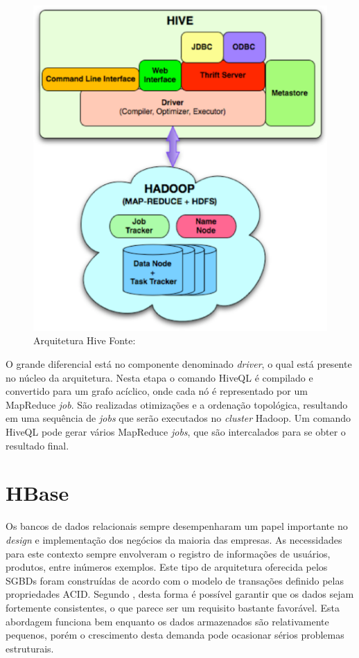 \begin{figure}[ht!]
	\centering
	\includegraphics[keepaspectratio=true,scale=0.5]
	  {figuras/hive.eps}
	\caption[Arquitetura Hive]{Arquitetura Hive
	\protect\linebreak Fonte: \cite{thusoo2009}}
	\label{fig-hive}
\end{figure}
\FloatBarrier

O grande diferencial está no componente denominado \textit{driver}, o qual está presente no núcleo da arquitetura. Nesta etapa o comando HiveQL é compilado e convertido para um grafo acíclico, onde cada nó é representado por um MapReduce \textit{job}. São realizadas otimizações e a ordenação topológica, resultando em uma sequência de \textit{jobs} que serão executados no \textit{cluster} Hadoop. Um comando HiveQL pode gerar vários MapReduce \textit{jobs}, que são intercalados para se obter o resultado final.


\section{HBase}

Os bancos de dados relacionais sempre desempenharam um papel importante no \textit{design} e implementação dos negócios da maioria das empresas. As necessidades para este contexto sempre envolveram o registro de informações de usuários, produtos, entre inúmeros exemplos. Este tipo de arquitetura oferecida pelos SGBDs foram construídas de acordo com o modelo de transações definido pelas propriedades ACID. Segundo , desta forma é possível garantir que os dados sejam fortemente consistentes, o que parece ser um requisito bastante favorável. Esta abordagem funciona bem enquanto os dados armazenados são relativamente pequenos, porém o crescimento desta demanda pode ocasionar sérios problemas estruturais.

